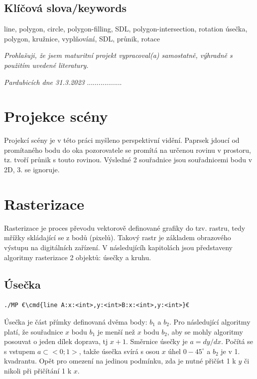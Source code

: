 \documentclass[a4paper,12pt]{report}
\newcommand{\cmd}[1]{\textcolor{blue}{\textbf{#1}}}
\begin{document}
\section*{Klíčová slova/keywords}
line, polygon, circle, polygon-filling, SDL, polygon-intersection, rotation
úsečka, polygon, kružnice, vyplňování, SDL, průnik, rotace

\clearpage

\textit{Prohlašuji, že jsem maturitní projekt vypracoval(a) samostatně, výhradně s použitím uvedené
literatury.}
\\
\vfill
\par\noindent\textit{Pardubicích dne 31.3.2023} \hfill..................
\clearpage


\let\cleardoublepage\clearpage
\tableofcontents








\chapter{Projekce scény}
Projekcí scény je v této práci myšleno perspektivní vidění.
Paprsek jdoucí od promítaného bodu do oka pozorovatele se promítá na určenou rovinu v prostoru, tz. tvoří průnik s touto rovinou. Výsledné 2 souřadnice jsou souřadnicemi bodu v 2D, 3. se ignoruje.


\chapter{Rasterizace}
Rasterizace je proces převodu vektorově definované grafiky do tzv. rastru, tedy mřížky skládající se z bodů (pixelů).
Takový rastr je základem obrazového výstupu na digitálních zařízení.
V následujícíh kapitolách jsou představeny algoritmy rasterizace 2 objektů: úsečky a kruhu.


\section{Úsečka}
\begin{lstlisting}
./MP €\cmd{line A:x:<int>,y:<int>B:x:<int>,y:<int>}€
\end{lstlisting}

Úsečka je část přímky definovaná dvěma body: $b_1$ a $b_2$.
Pro následující algoritmy platí, že souřadnice $x$ bodu $b_1$ je menší než $x$ bodu $b_2$, aby se mohly algoritmy posouvat o jeden dílek doprava, tj $x+1$.
Směrnice úsečky je $a = dy/dx$. 
Počítá se s vstupem $a\subset<0;1>$, takže úsečka svírá s osou $x$ úhel $0-45^\circ$ a $b_2$ je v 1. kvadrantu. Opět pro omezení na jedinou podmínku, zda je nutné přičíst 1 k $y$ či nikoli při přičítání 1 k $x$.
\end{document}
